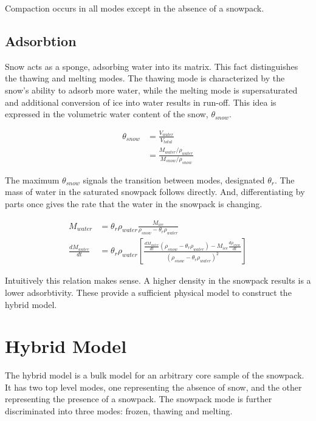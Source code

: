 \documentclass{article}
\begin{document}
Compaction occurs in all modes except in the
absence of a snowpack.


\subsection{Adsorbtion}

Snow acts as a sponge, adsorbing water into its matrix.
This fact distinguishes the thawing and melting modes.
The thawing mode is characterized by the snow's ability
to adsorb more water, while the melting mode is supersaturated
and additional conversion of ice into water results in run-off.
This idea is expressed in the volumetric water content of the snow,
$\theta_{snow}$.

\begin{align}
\theta_{snow} &= \frac{V_{water}}{V_{total}} \\
   &= \frac{M_{water}/ \rho_{water}}{M_{snow}/\rho_{snow}}
\end{align}

The maximum $\theta_{snow}$ signals the transition between
modes, designated $\theta_{r}$.
The mass of water in the saturated snowpack follows directly.
And, differentiating by parts once gives the rate that the water in the
snowpack is changing.

\begin{align}
M_{water}  &= \theta_{r} \rho_{water}
      \frac{M_{ice}}{\rho_{snow} - \theta_{r} \rho_{water}} \\
\frac{d M_{water}}{dt} &=  \theta_{r} \rho_{water}
   \left[ \frac{\frac{d M_{water}}{dt} (\rho_{snow} - \theta_{r} \rho_{water})
                  - M_{ice} \frac{d \rho_{snow}}{dt} }
          {(\rho_{snow} - \theta_{r} \rho_{water})^2} \right]
\end{align}

Intuitively this relation makes sense.
A higher density in the snowpack results is a lower adsorbtivity.
These provide a sufficient physical model to construct the hybrid model.


\section{Hybrid Model}

The hybrid model is a bulk model for an arbitrary core
sample of the snowpack.
It has two top level modes, one representing the absence
of snow, and the other representing the presence of a snowpack.
The snowpack mode is further discriminated into three modes:
frozen, thawing and melting.
\end{document}
